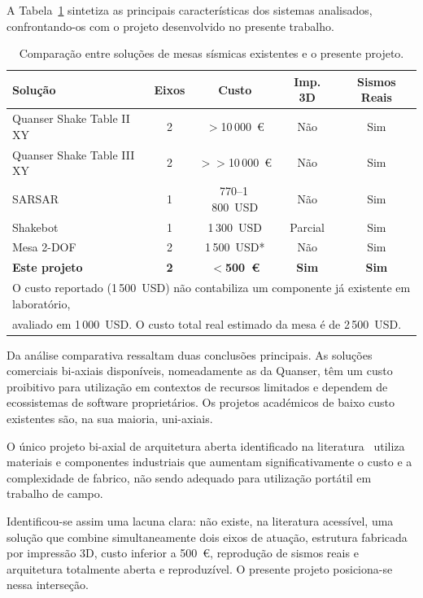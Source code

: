 A Tabela~\ref{tab:comparativo} sintetiza as principais características dos sistemas analisados, confrontando-os com o projeto desenvolvido no presente trabalho.

\begin{table}[h]
\centering
\caption{Comparação entre soluções de mesas sísmicas existentes e o presente projeto.}
\label{tab:comparativo}
\begin{tabular}{lcccc}
\hline
\textbf{Solução} & \textbf{Eixos} & \textbf{Custo} & \textbf{Imp. 3D} & \textbf{Sismos Reais} \\
\hline
Quanser Shake Table II XY~\cite{QuanserShakeTableIIXY} & 2 & $>$10\,000~€ & Não & Sim \\
Quanser Shake Table III XY~\cite{QuanserShakeTableIII} & 2 & $>>$10\,000~€ & Não & Sim \\
SARSAR~\cite{Damci2018}                                & 1 & 770--1\,800~USD & Não & Sim \\
Shakebot~\cite{Shakebot2022}                           & 1 & 1\,300~USD & Parcial & Sim \\
Mesa 2-DOF~\cite{2DOF2025}                             & 2 & 1\,500~USD* & Não & Sim \\
\textbf{Este projeto}                                  & \textbf{2} & \textbf{$<$500~€} & \textbf{Sim} & \textbf{Sim} \\
\hline
\multicolumn{5}{l}{%
  \footnotesize * O custo reportado (1\,500~USD) não contabiliza um componente já existente em laboratório,}\\
\multicolumn{5}{l}{%
  \footnotesize \phantom{* }avaliado em 1\,000~USD. O custo total real estimado da mesa é de 2\,500~USD.}\\
\end{tabular}
\end{table}

Da análise comparativa ressaltam duas conclusões principais. As soluções comerciais bi-axiais disponíveis, nomeadamente as da Quanser, têm um custo proibitivo para utilização em contextos de recursos limitados e dependem de ecossistemas de software proprietários. Os projetos académicos de baixo custo existentes são, na sua maioria, uni-axiais.

O único projeto bi-axial de arquitetura aberta identificado na literatura~\cite{2DOF2025} utiliza materiais e componentes industriais que aumentam significativamente o custo e a complexidade de fabrico, não sendo adequado para utilização portátil em trabalho de campo.

Identificou-se assim uma lacuna clara: não existe, na literatura acessível, uma solução que combine simultaneamente dois eixos de atuação, estrutura fabricada por impressão 3D, custo inferior a 500~€, reprodução de sismos reais e arquitetura totalmente aberta e reproduzível. O presente projeto posiciona-se nessa interseção.
